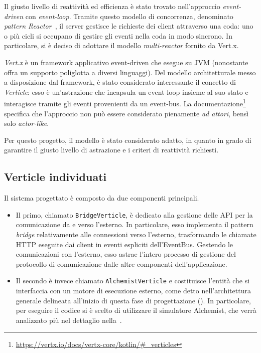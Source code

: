       Il giusto livello di reattività ed efficienza è stato trovato nell'approccio \emph{event-driven} con \emph{event-loop}.
      Tramite questo modello di concorrenza, denominato \emph{pattern Reactor}~\cite{Schmidt1995ReactorAO}, il server gestisce le richieste dei client attraverso una coda:
      uno o più cicli si occupano di gestire gli eventi nella coda in modo sincrono.
      In particolare, si è deciso di adottare il modello \emph{multi-reactor} fornito da Vert.x.

      \emph{Vert.x} è un framework applicativo event-driven che esegue su JVM (nonostante offra un supporto poliglotta a diversi linguaggi).
      Del modello architetturale messo a disposizione dal framework, è stato considerato interessante il concetto di \emph{Verticle}:
      esso è un'astrazione che incapsula un event-loop insieme al suo stato e interagisce tramite gli eventi provenienti da un event-bus.
      La documentazione\footnote{\url{https://vertx.io/docs/vertx-core/kotlin/\#_verticles}} %
      specifica che l'approccio non può essere considerato pienamente \emph{ad attori}, bensì solo \emph{actor-like}.

      Per questo progetto, il modello è stato considerato adatto, in quanto in grado di garantire il giusto livello di astrazione e i criteri di reattività richiesti.

    \subsection{Verticle individuati}
      Il sistema progettato è composto da due componenti principali.

      \begin{itemize}
        \item
          Il primo, chiamato \texttt{BridgeVerticle}, è dedicato alla gestione delle API per la comunicazione da e verso l'esterno.
          In particolare, esso implementa il pattern \emph{bridge} relativamente alle connessioni verso l'esterno, trasformando le chiamate HTTP eseguite dai client in eventi espliciti dell'EventBus.
          Gestendo le comunicazioni con l'esterno, esso astrae l'intero processo di gestione del protocollo di comunicazione dalle altre componenti dell'applicazione.
        \item
          Il secondo è invece chiamato \texttt{AlchemistVerticle} e costituisce l'entità che si interfaccia con un motore di esecuzione esterno,
          come detto nell'architettura generale delineata all'inizio di questa fase di progettazione ().
          In particolare, per eseguire il codice si è scelto di utilizzare il simulatore Alchemist, che verrà analizzato più nel dettaglio nella~.
      \end{itemize}

